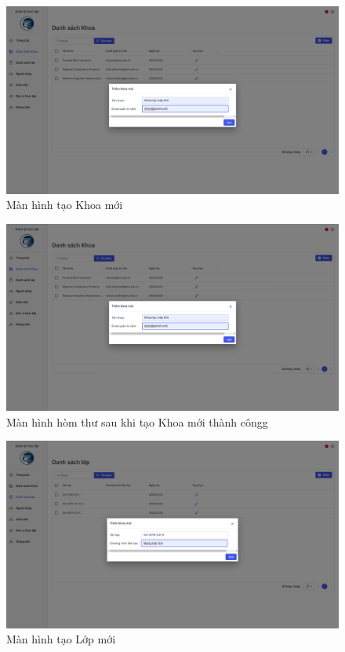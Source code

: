 \documentclass[./../main.tex]{subfiles}
\begin{document}
\begin{figure}[]
	\includegraphics[width=\linewidth]{./images/image23.png}
	\caption{Màn hình tạo Khoa mới}
	\label{fig:add_org}
\end{figure}

\begin{figure}[]
	\includegraphics[width=\linewidth]{./images/image23.png} %
	\caption{Màn hình hòm thư sau khi tạo Khoa mới thành côngg}
	\label{fig:add_org_success}
\end{figure}

\begin{figure}[]
	\includegraphics[width=\linewidth]{./images/image25.png}
	\caption{Màn hình tạo Lớp mới}
	\label{fig:add_class}
\end{figure}
\end{document}
